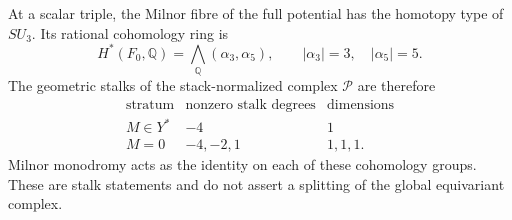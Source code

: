 \begin{theorem}
\label{thm:c3-scalar-milnor}
At a scalar triple, the Milnor fibre of the full potential has the
homotopy type of $SU_3$. Its rational cohomology ring is
\begin{equation}
 H^*(F_0,\mathbb Q)=\bigwedge_{\mathbb Q}(\alpha_3,\alpha_5),
 \qquad |\alpha_3|=3,\quad |\alpha_5|=5.
 \label{eq:c3-collision-milnor-cohomology}
\end{equation}
The geometric stalks of the stack-normalized complex $\mathcal P$
are therefore
\[
\begin{array}{c|c|c}
\text{stratum}&\text{nonzero stalk degrees}&\text{dimensions}\\\hline
M\in Y^*&-4&1\\
M=0&-4,-2,1&1,1,1.
\end{array}
\]
Milnor monodromy acts as the identity on each of these cohomology
groups. These are stalk statements and do not assert a splitting
of the global equivariant complex.
\end{theorem}

